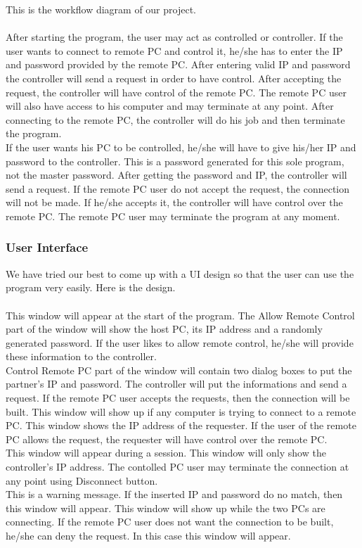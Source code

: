 \documentclass{article}
\begin{document}
This is the workflow diagram of our project.\\ \\
%
After starting the program, the user may act as controlled or controller. If the user wants to connect to remote PC and control it, he/she has to enter the IP and password provided by the remote PC. After entering valid IP and password the controller will send a request in order to have control. After accepting the request, the controller will have control of the remote PC. The remote PC user will also have access to his computer and may terminate at any point. After connecting to the remote PC, the controller will do his job and then terminate the program. \\
If the user wants his PC to be controlled, he/she will have to give his/her IP and password to the controller. This is a password generated for this sole program, not the master password. After getting the password and IP, the controller will send a request. If the remote PC user do not accept the request, the connection will not be made. If he/she accepts it, the controller will have control over the remote PC. The remote PC user may terminate the program at any moment.\\

\subsubsection{User Interface}

We have tried our best to come up with a UI design so that the user can use the program very easily. Here is the design.\\ \\ 
This window will appear at the start of the program. The Allow Remote Control part of the window will show the host PC, its IP address and a randomly generated password. If the user likes to allow remote control, he/she will provide these information to the controller. \\
Control Remote PC part of the window will contain two dialog boxes to put the partner's IP and password. The controller will put the informations and send a request. If the remote PC user accepts the requests, then the connection will be built. 
This window will show up if any computer is trying to connect to a remote PC. This window shows the IP address of the requester. If the user of the remote PC allows the request, the requester will have control over the remote PC. \\
This window will appear during a session. This window will only show the controller's IP address. The contolled PC user may terminate the connection at any point using Disconnect button. \\
This is a warning message. If the inserted IP and password do no match, then this window will appear.
This window will show up while the two PCs are connecting.
If the remote PC user does not want the connection to be built, he/she can deny the request. In this case this window will appear.
\end{document}
